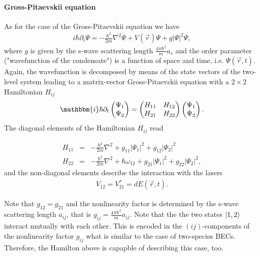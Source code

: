 \documentclass[12pt]{article}
\newcommand{\ic}{\mathbbm{i}}
\begin{document}
\paragraph{Gross-Pitaevskii equation}
As for the case of the Gross-Pitaevskii equation we have
\begin{eqnarray}
i \hbar \partial_t \Psi = -\frac{\hbar^2}{2m}\nabla^2\Psi+V(\vec{r})\Psi+g|\Psi|^2\Psi,\label{eq:GPE_dyn}
\end{eqnarray}
where $g$ is given by the s-wave scattering length $\frac{4\pi \hbar^2}{m}a_s$ and the order parameter ("wavefunction of the condensate") is a function of space and time, i.e.  $\Psi(\vec{r},t)$. Again, the wavefunction is decomposed by means of the state vectors of the two-level system  leading to a matrix-vector Gross-Pitaevskii equation with a $2 \times 2$ Hamiltonian $H_{ij}$
\begin{align}
  \ic \hbar \partial_t \begin{pmatrix}
    \Psi_1 \\
    \Psi_2 
  \end{pmatrix} = 
  \begin{pmatrix}
    H_{11}& H_{12} \\
    H_{21} & H_{22}
  \end{pmatrix}\begin{pmatrix}
    \Psi_1 \\
    \Psi_2 
  \end{pmatrix}.
\end{align}
The diagonal elements of the Hamiltonian $H_{ij}$ read

\begin{eqnarray}
H_{11}& = &  -\frac{\hbar^2}{2m}\nabla^2 +g_{11} |\Psi_1|^2 +g_{12} |\Psi_2|^2 \\
H_{22}& = &  -\frac{\hbar^2}{2m}\nabla^2 +\hbar \omega_{12}+g_{21} |\Psi_1|^2 +g_{22} |\Psi_2|^2 ,
\end{eqnarray}
and the non-diagonal elements describe the interaction with the lasers
\begin{eqnarray}
V_{12} =V_{21}^* = dE(\vec{r},t).
\end{eqnarray}

Note that $g_{12}=g_{21}$ and the nonlinearity factor is determined by the s-wave scattering length $a_{ij}$, that is $g_{ij}=\frac{4\pi \hbar^2}{m}a_{ij}$.
Note that the the two states $\ket{1,2}$ interact mutually with each other. This is encoded in the $(ij)$-components of the nonlinearity factor $g_{ij}$ what is similar to the case of two-species BECs. Therefore, the Hamilton above is capapble of describing this case, too. 
\end{document}
